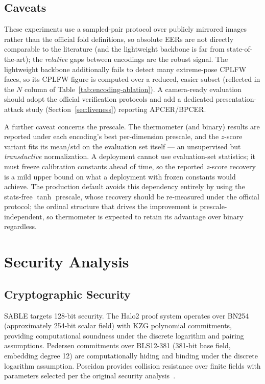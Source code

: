 \documentclass[conference]{IEEEtran}
\begin{document}
\subsection{Caveats}

These experiments use a sampled-pair protocol over publicly mirrored images
rather than the official fold definitions, so absolute EERs are not directly
comparable to the literature (and the lightweight backbone is far from
state-of-the-art); the \emph{relative} gaps between encodings are the robust
signal. The lightweight backbone additionally fails to detect many extreme-pose
CPLFW faces, so its CPLFW figure is computed over a reduced, easier subset
(reflected in the $N$ column of Table~\ref{tab:encoding-ablation}). A
camera-ready evaluation should adopt the official verification protocols and add
a dedicated presentation-attack study (Section~\ref{sec:liveness}) reporting
APCER/BPCER.

A further caveat concerns the prescale. The thermometer (and binary) results are
reported under each encoding's best per-dimension prescale, and the $z$-score
variant fits its mean/std on the evaluation set itself --- an unsupervised but
\emph{transductive} normalization. A deployment cannot use evaluation-set
statistics; it must freeze calibration constants ahead of time, so the reported
$z$-score recovery is a mild upper bound on what a deployment with frozen
constants would achieve. The production default avoids this dependency entirely
by using the stats-free $\tanh$ prescale, whose recovery should be re-measured
under the official protocol; the ordinal structure that drives the improvement is
prescale-independent, so thermometer is expected to retain its advantage over
binary regardless.

\section{Security Analysis}
\label{sec:security}

\subsection{Cryptographic Security}

SABLE targets 128-bit security. The Halo2 proof system operates over BN254 (approximately 254-bit scalar field) with KZG polynomial commitments, providing computational soundness under the discrete logarithm and pairing assumptions. Pedersen commitments over BLS12-381 (381-bit base field, embedding degree 12) are computationally hiding and binding under the discrete logarithm assumption. Poseidon provides collision resistance over finite fields with parameters selected per the original security analysis~\cite{grassi2021}.
\end{document}
